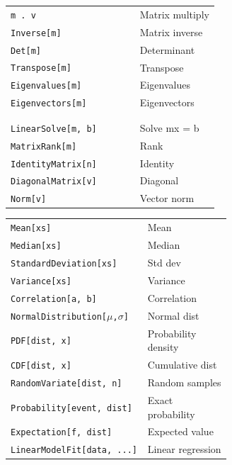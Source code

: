 \documentclass[10pt]{extarticle}
\begin{document}
\begin{multicols}{2}
\begin{tabularx}{\linewidth}{@{}>{\raggedright\arraybackslash}p{0.62\linewidth}@{\enspace}Y@{}}
\texttt{m . v}                       & Matrix multiply \\
\texttt{Inverse[m]}                  & Matrix inverse \\
\texttt{Det[m]}                      & Determinant \\
\texttt{Transpose[m]}               & Transpose \\
\texttt{Eigenvalues[m]}             & Eigenvalues \\
\texttt{Eigenvectors[m]}            & Eigenvectors \\
 & \\
 \\
\texttt{LinearSolve[m, b]}          & Solve mx = b \\
\texttt{MatrixRank[m]}              & Rank \\
\texttt{IdentityMatrix[n]}          & Identity \\
\texttt{DiagonalMatrix[v]}         & Diagonal \\
\texttt{Norm[v]}                     & Vector norm \\
\end{tabularx}

\begin{tabularx}{\linewidth}{@{}>{\raggedright\arraybackslash}p{0.62\linewidth}@{\enspace}Y@{}}
\texttt{Mean[xs]}                    & Mean \\
\texttt{Median[xs]}                  & Median \\
\texttt{StandardDeviation[xs]}      & Std dev \\
\texttt{Variance[xs]}               & Variance \\
\texttt{Correlation[a, b]}          & Correlation \\
\texttt{NormalDistribution[$\mu$,$\sigma$]}  & Normal dist \\
\texttt{PDF[dist, x]}               & Probability density \\
\texttt{CDF[dist, x]}               & Cumulative dist \\
\texttt{RandomVariate[dist, n]}     & Random samples \\
\texttt{Probability[event, dist]}   & Exact probability \\
\texttt{Expectation[f, dist]}       & Expected value \\
\texttt{LinearModelFit[data, ...]} & Linear regression \\
\end{tabularx}


\end{multicols}
\end{document}
